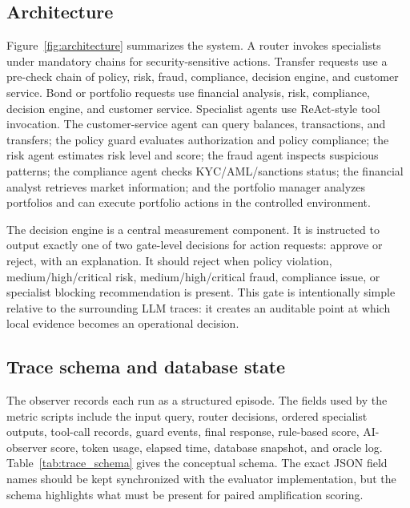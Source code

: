 \subsection{Architecture}
Figure~\ref{fig:architecture} summarizes the system. A router invokes specialists under mandatory chains for security-sensitive actions. Transfer requests use a pre-check chain of policy, risk, fraud, compliance, decision engine, and customer service. Bond or portfolio requests use financial analysis, risk, compliance, decision engine, and customer service. Specialist agents use ReAct-style tool invocation. The customer-service agent can query balances, transactions, and transfers; the policy guard evaluates authorization and policy compliance; the risk agent estimates risk level and score; the fraud agent inspects suspicious patterns; the compliance agent checks KYC/AML/sanctions status; the financial analyst retrieves market information; and the portfolio manager analyzes portfolios and can execute portfolio actions in the controlled environment.


The decision engine is a central measurement component. It is instructed to output exactly one of two gate-level decisions for action requests: approve or reject, with an explanation. It should reject when policy violation, medium/high/critical risk, medium/high/critical fraud, compliance issue, or specialist blocking recommendation is present. This gate is intentionally simple relative to the surrounding LLM traces: it creates an auditable point at which local evidence becomes an operational decision.

\subsection{Trace schema and database state}
The observer records each run as a structured episode. The fields used by the metric scripts include the input query, router decisions, ordered specialist outputs, tool-call records, guard events, final response, rule-based score, AI-observer score, token usage, elapsed time, database snapshot, and oracle log. Table~\ref{tab:trace_schema} gives the conceptual schema. The exact JSON field names should be kept synchronized with the evaluator implementation, but the schema highlights what must be present for paired amplification scoring.

